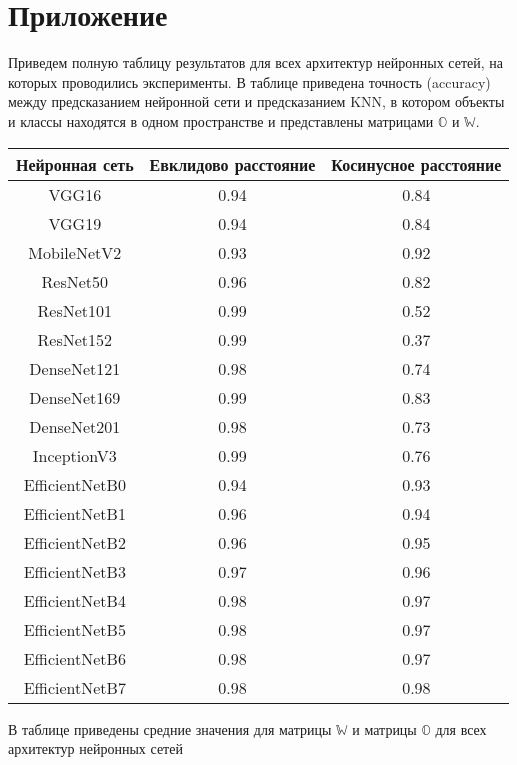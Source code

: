 \documentclass{article}
\begin{document}


\newpage

\section{Приложение}

Приведем полную таблицу результатов для всех архитектур нейронных сетей, на которых проводились эксперименты. В таблице приведена точность (accuracy) между предсказанием нейронной сети и предсказанием KNN, в котором объекты и классы находятся в одном пространстве и представлены матрицами $\mathbb{O}$ и $\mathbb{W}$.

\begin{center}
\begin{tabular}{ |c|c|c| } 
 \hline
 Нейронная сеть & Евклидово расстояние & Косинусное расстояние \\ 
 \hline
 \hline
 VGG16 & 0.94 & 0.84 \\
 \hline
 VGG19 & 0.94 & 0.84 \\
 \hline
 MobileNetV2 & 0.93 & 0.92 \\
 \hline
 ResNet50 & 0.96 & 0.82 \\
 \hline
 ResNet101 & 0.99 & 0.52 \\
 \hline
 ResNet152 & 0.99 & 0.37 \\
 \hline
 DenseNet121 & 0.98 & 0.74 \\
 \hline
 DenseNet169 & 0.99 & 0.83 \\
 \hline
 DenseNet201 & 0.98 & 0.73 \\
 \hline
 InceptionV3 & 0.99 & 0.76 \\
 \hline
 EfficientNetB0 & 0.94 & 0.93 \\
 \hline
 EfficientNetB1 & 0.96 & 0.94 \\
 \hline
 EfficientNetB2 & 0.96 & 0.95 \\
 \hline
 EfficientNetB3 & 0.97 & 0.96 \\
 \hline
 EfficientNetB4 & 0.98 & 0.97 \\
 \hline
 EfficientNetB5 & 0.98 & 0.97 \\
 \hline
 EfficientNetB6 & 0.98 & 0.97 \\
 \hline
 EfficientNetB7 & 0.98 & 0.98 \\
 \hline
\end{tabular}
\end{center}



В таблице приведены средние значения для матрицы $\mathbb{W}$ и матрицы $\mathbb{O}$ для всех архитектур нейронных сетей
\end{document}

